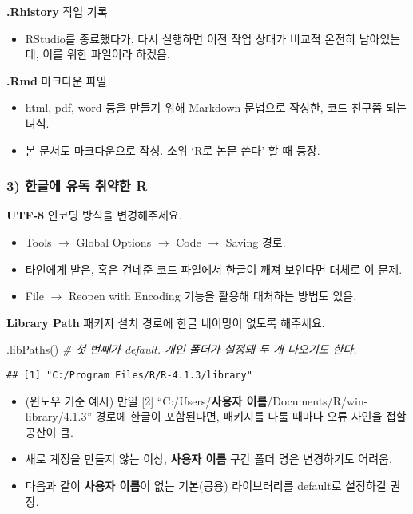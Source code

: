\documentclass[
  12,
]{article}
\newenvironment{Shaded}{\begin{snugshade}}{\end{snugshade}}
\newcommand{\CommentTok}[1]{\textcolor[rgb]{0.56,0.35,0.01}{\textit{#1}}}
\newcommand{\FunctionTok}[1]{\textcolor[rgb]{0.00,0.00,0.00}{#1}}
\newcommand{\NormalTok}[1]{#1}
\providecommand{\tightlist}{%
  \setlength{\itemsep}{0pt}\setlength{\parskip}{0pt}}
\begin{document}
\textbf{.Rhistory} 작업 기록

\begin{itemize}
\tightlist
\item
  RStudio를 종료했다가, 다시 실행하면 이전 작업 상태가 비교적 온전히
  남아있는데, 이를 위한 파일이라 하겠음.
\end{itemize}

\textbf{.Rmd} 마크다운 파일

\begin{itemize}
\item
  html, pdf, word 등을 만들기 위해 Markdown 문법으로 작성한, 코드 친구쯤
  되는 녀석.
\item
  본 문서도 마크다운으로 작성. 소위 `R로 논문 쓴다' 할 때 등장.
\end{itemize}

\hypertarget{uxd55cuxae00uxc5d0-uxc720uxb3c5-uxcde8uxc57duxd55c-r}{%
\subsubsection{3) 한글에 유독 취약한
R}\label{uxd55cuxae00uxc5d0-uxc720uxb3c5-uxcde8uxc57duxd55c-r}}

\textbf{UTF-8} 인코딩 방식을 변경해주세요.

\begin{itemize}
\item
  Tools \(\to\) Global Options \(\to\) Code \(\to\) Saving 경로.
\item
  타인에게 받은, 혹은 건네준 코드 파일에서 한글이 깨져 보인다면 대체로
  이 문제.
\item
  File \(\to\) Reopen with Encoding 기능을 활용해 대처하는 방법도 있음.
\end{itemize}

\textbf{Library Path} 패키지 설치 경로에 한글 네이밍이 없도록 해주세요.

\begin{Shaded}
\begin{Highlighting}[]
\FunctionTok{.libPaths}\NormalTok{() }\CommentTok{\# 첫 번째가 default. 개인 폴더가 설정돼 두 개 나오기도 한다.}
\end{Highlighting}
\end{Shaded}

\begin{verbatim}
## [1] "C:/Program Files/R/R-4.1.3/library"
\end{verbatim}

\begin{itemize}
\item
  (윈도우 기준 예시) 만일 {[}2{]} ``C:/Users/\textbf{사용자
  이름}/Documents/R/win-library/4.1.3'' 경로에 한글이 포함된다면,
  패키지를 다룰 때마다 오류 사인을 접할 공산이 큼.
\item
  새로 계정을 만들지 않는 이상, \textbf{사용자 이름} 구간 폴더 명은
  변경하기도 어려움.
\item
  다음과 같이 \textbf{사용자 이름}이 없는 기본(공용) 라이브러리를
  default로 설정하길 권장.
\end{itemize}
\end{document}
